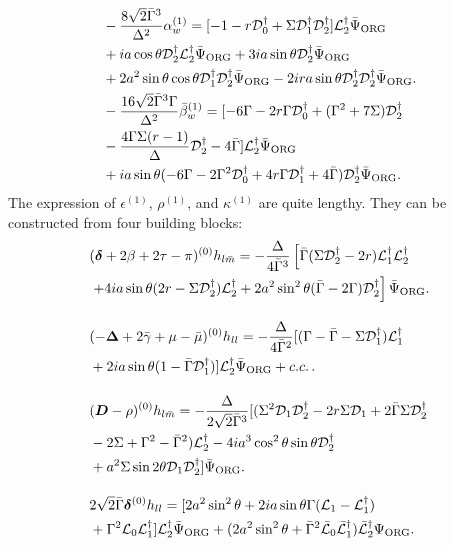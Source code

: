 \documentclass[aps,prd,amsmath,floats,floatfix, twocolumn,
superscriptaddress,nofootinbib,showpacs]{revtex4-1}
\newcommand{\hertz}{\Psi_{\rm ORG}}
\newcommand{\hertzbar}{\bar{\Psi}_{\rm ORG}}
\begin{document}
\begin{align}
    &-\frac{8\sqrt{2}\bar{\Gamma}^3}{\Delta^2}\alpha_w^{(1)}=[-1 - r \mathcal{D}^\dagger_0 + \Sigma \mathcal{D}^\dagger_1\mathcal{D}^\dagger_2] \mathcal{L}_2^\dagger\hertzbar \notag \\
    &+i a \cos\theta \mathcal{D}^\dagger_2 \mathcal{L}^\dagger_2\hertzbar + 3i a \sin\theta \mathcal{D}^\dagger_2\hertzbar \notag \\
    & + 2 a^2  \sin\theta \cos\theta\mathcal{D}^\dagger_1\mathcal{D}^\dagger_2\hertzbar - 2ir a \sin\theta \mathcal{D}^\dagger_2\mathcal{D}^\dagger_2\hertzbar. \\
    &-\frac{16\sqrt{2}\bar{\Gamma}^3\Gamma}{\Delta^2}\bar{\beta}_w^{(1)}= [-6\Gamma - 2r\Gamma\mathcal{D}^\dagger_0 + (\Gamma^2 + 7\Sigma)\mathcal{D}^\dagger_2   \notag \\
    & - \frac{4\Gamma\Sigma(r-1)}{\Delta}\mathcal{D}^\dagger_2 - 4\bar{\Gamma}]\mathcal{L}_2^\dagger\hertzbar \notag \\
    &+ia\sin\theta (-6\Gamma - 2 \Gamma^2\mathcal{D}^\dagger_0+ 4r \Gamma\mathcal{D}^\dagger_1 + 4\bar{\Gamma})\mathcal{D}^\dagger_2\hertzbar.
\end{align}
The expression of $\epsilon^{(1)}$, $\rho^{(1)}$, and $\kappa^{(1)}$ are quite lengthy. They can be constructed from four building blocks:
\begin{align}
    &(\bm{\delta}+2\beta+2\tau-\pi)^{(0)}h_{l\bar{m}}=-\frac{\Delta}{4\bar{\Gamma}^3} \left[ \bar{\Gamma}(\Sigma\mathcal{D}_2^\dagger-2r)\mathcal{L}_1^\dagger\mathcal{L}_2^\dagger\right.\notag \\
    &\left.+4ia\sin\theta (2r-\Sigma\mathcal{D}_2^\dagger)\mathcal{L}_2^\dagger +2a^2\sin^2\theta (\bar{\Gamma}-2\Gamma)\mathcal{D}_2^\dagger\right]\hertzbar. \label{eq:app:hlmbar} \\[10pt]
    &(-\bm{\Delta}+2\bar{\gamma}+\mu-\bar{\mu})^{(0)}h_{ll}=-\frac{\Delta}{4\bar{\Gamma}^2}[(\Gamma-\bar{\Gamma}-\Sigma\mathcal{D}_1^\dagger)\mathcal{L}_1^\dagger\notag \\
    &+2ia\sin\theta(1-\bar{\Gamma}\mathcal{D}_1^\dagger)]\mathcal{L}_2^\dagger\hertzbar + c.c.\,. \\[10pt]
    &(\bm{D}-\rho)^{(0)}h_{l\bar{m}}=-\frac{\Delta}{2\sqrt{2}\bar{\Gamma}^3}[(\Sigma^2\mathcal{D}_1\mathcal{D}_2^\dagger-2r\Sigma\mathcal{D}_1+2\bar{\Gamma}\Sigma\mathcal{D}_2^\dagger \notag \\
    &-2\Sigma+\Gamma^2-\bar{\Gamma}^2)\mathcal{L}_2^\dagger -4ia^3\cos^2\theta\sin\theta\mathcal{D}_2^\dagger \notag \\
    &+a^2\Sigma\sin2\theta \mathcal{D}_1\mathcal{D}_2^\dagger]\hertzbar. \\[10pt]
    &2\sqrt{2}\bar{\Gamma}\bm{\delta}^{(0)}h_{ll}= [2 a^2 \sin ^2\theta +2 i a \sin\theta \Gamma (\mathcal{L}_1-\mathcal{L}_1^\dagger)  \notag \\
    &+\Gamma^2 \mathcal{L}_0\mathcal{L}_1^\dagger]\mathcal{L}_2^\dagger\hertzbar+(2 a^2 \sin ^2\theta +\bar{\Gamma}^2 \bar{\mathcal{L}}_0\bar{\mathcal{L}}_1^\dagger)\bar{\mathcal{L}}_2^\dagger\hertz. \label{eq:app:hll}
\end{align}
\end{document}
